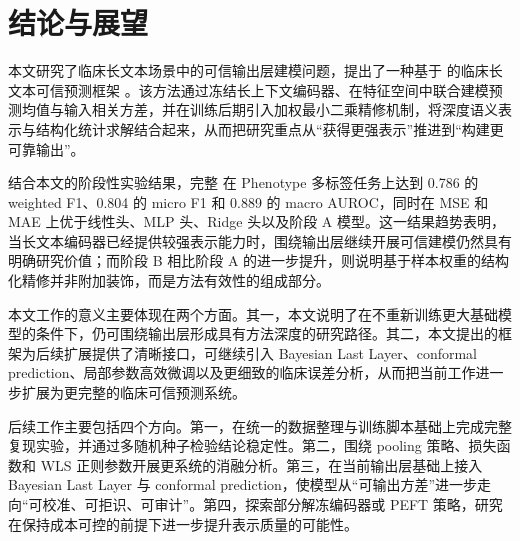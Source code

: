 \section{结论与展望}
本文研究了临床长文本场景中的可信输出层建模问题，提出了一种基于 \encoder{} 的临床长文本可信预测框架 \method{}。该方法通过冻结长上下文编码器、在特征空间中联合建模预测均值与输入相关方差，并在训练后期引入加权最小二乘精修机制，将深度语义表示与结构化统计求解结合起来，从而把研究重点从“获得更强表示”推进到“构建更可靠输出”。

结合本文的阶段性实验结果，完整 \method{} 在 Phenotype 多标签任务上达到 0.786 的 weighted F1、0.804 的 micro F1 和 0.889 的 macro AUROC，同时在 MSE 和 MAE 上优于线性头、MLP 头、Ridge 头以及阶段 A 模型。这一结果趋势表明，当长文本编码器已经提供较强表示能力时，围绕输出层继续开展可信建模仍然具有明确研究价值；而阶段 B 相比阶段 A 的进一步提升，则说明基于样本权重的结构化精修并非附加装饰，而是方法有效性的组成部分。

本文工作的意义主要体现在两个方面。其一，本文说明了在不重新训练更大基础模型的条件下，仍可围绕输出层形成具有方法深度的研究路径。其二，本文提出的框架为后续扩展提供了清晰接口，可继续引入 Bayesian Last Layer、conformal prediction、局部参数高效微调以及更细致的临床误差分析，从而把当前工作进一步扩展为更完整的临床可信预测系统。

后续工作主要包括四个方向。第一，在统一的数据整理与训练脚本基础上完成完整复现实验，并通过多随机种子检验结论稳定性。第二，围绕 pooling 策略、损失函数和 WLS 正则参数开展更系统的消融分析。第三，在当前输出层基础上接入 Bayesian Last Layer 与 conformal prediction，使模型从“可输出方差”进一步走向“可校准、可拒识、可审计”。第四，探索部分解冻编码器或 PEFT 策略，研究在保持成本可控的前提下进一步提升表示质量的可能性。
